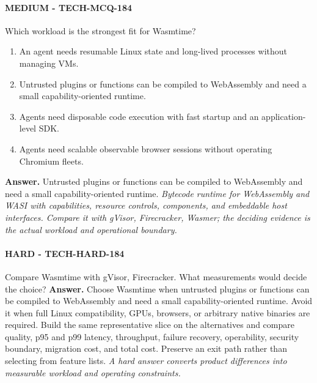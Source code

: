 \paragraph{MEDIUM - TECH-MCQ-184} Which workload is the strongest fit for Wasmtime?
\begin{enumerate}[label=\Alph*.]
\item An agent needs resumable Linux state and long-lived processes without managing VMs.
\item Untrusted plugins or functions can be compiled to WebAssembly and need a small capability-oriented runtime.
\item Agents need disposable code execution with fast startup and an application-level SDK.
\item Agents need scalable observable browser sessions without operating Chromium fleets.
\end{enumerate}
\textbf{Answer.} Untrusted plugins or functions can be compiled to WebAssembly and need a small capability-oriented runtime.
\textit{Bytecode runtime for WebAssembly and WASI with capabilities, resource controls, components, and embeddable host interfaces. Compare it with gVisor, Firecracker, Wasmer; the deciding evidence is the actual workload and operational boundary.}
\paragraph{HARD - TECH-HARD-184} Compare Wasmtime with gVisor, Firecracker. What measurements would decide the choice?
\textbf{Answer.} Choose Wasmtime when untrusted plugins or functions can be compiled to WebAssembly and need a small capability-oriented runtime. Avoid it when full Linux compatibility, GPUs, browsers, or arbitrary native binaries are required. Build the same representative slice on the alternatives and compare quality, p95 and p99 latency, throughput, failure recovery, operability, security boundary, migration cost, and total cost. Preserve an exit path rather than selecting from feature lists.
\textit{A hard answer converts product differences into measurable workload and operating constraints.}
